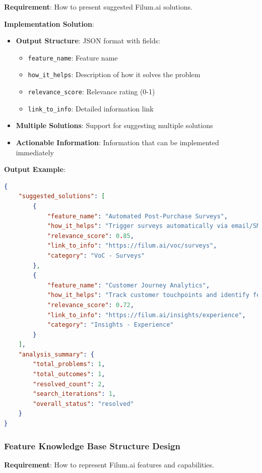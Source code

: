\documentclass[12pt,a4paper]{article}
\begin{document}
\textbf{Requirement}: How to present suggested Filum.ai solutions.

\textbf{Implementation Solution}:
\begin{itemize}
    \item \textbf{Output Structure}: JSON format with fields:
    \begin{itemize}
        \item \texttt{feature\_name}: Feature name
        \item \texttt{how\_it\_helps}: Description of how it solves the problem
        \item \texttt{relevance\_score}: Relevance rating (0-1)
        \item \texttt{link\_to\_info}: Detailed information link
    \end{itemize}
    \item \textbf{Multiple Solutions}: Support for suggesting multiple solutions
    \item \textbf{Actionable Information}: Information that can be implemented immediately
\end{itemize}

\textbf{Output Example}:
\begin{lstlisting}[language=json, caption=Output Solutions Example]
{
    "suggested_solutions": [
        {
            "feature_name": "Automated Post-Purchase Surveys",
            "how_it_helps": "Trigger surveys automatically via email/SMS after a transaction to collect consistent customer feedback",
            "relevance_score": 0.85,
            "link_to_info": "https://filum.ai/voc/surveys",
            "category": "VoC - Surveys"
        },
        {
            "feature_name": "Customer Journey Analytics",
            "how_it_helps": "Track customer touchpoints and identify feedback collection opportunities",
            "relevance_score": 0.72,
            "link_to_info": "https://filum.ai/insights/experience",
            "category": "Insights - Experience"
        }
    ],
    "analysis_summary": {
        "total_problems": 1,
        "total_outcomes": 1,
        "resolved_count": 2,
        "search_iterations": 1,
        "overall_status": "resolved"
    }
}
\end{lstlisting}

\subsubsection{Feature Knowledge Base Structure Design}

\textbf{Requirement}: How to represent Filum.ai features and capabilities.
\end{document}
